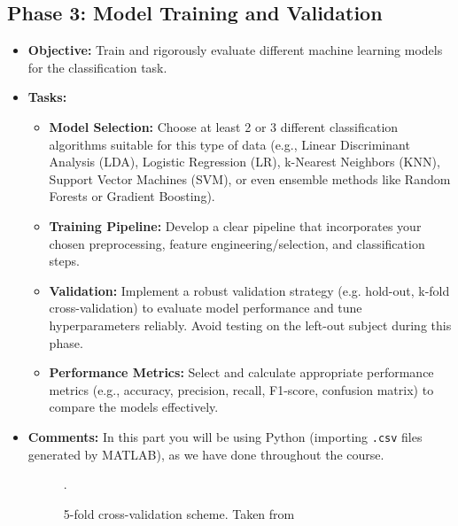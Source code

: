 \documentclass[11pt]{exam}
\begin{document}
    \subsection{Phase 3: Model Training and Validation}
    \begin{itemize}
        \item \textbf{Objective:} Train and rigorously evaluate different machine learning models for the classification task.
        \item \textbf{Tasks:}
        \begin{itemize}
            \item \textbf{Model Selection:} Choose at least 2 or 3 different classification algorithms suitable for this type of data (e.g., Linear Discriminant Analysis (LDA), Logistic Regression (LR), k-Nearest Neighbors (KNN), Support Vector Machines (SVM), or even ensemble methods like Random Forests or Gradient Boosting).
            \item \textbf{Training Pipeline:} Develop a clear pipeline that incorporates your chosen preprocessing, feature engineering/selection, and classification steps.
            \item \textbf{Validation:} Implement a robust validation strategy (e.g. hold-out, k-fold cross-validation) to evaluate model performance and tune hyperparameters reliably. Avoid testing on the left-out subject during this phase.
            \item \textbf{Performance Metrics:} Select and calculate appropriate performance metrics (e.g., accuracy, precision, recall, F1-score, confusion matrix) to compare the models effectively.
        \end{itemize}
        \item \textbf{Comments:} In this part you will be using Python (importing \texttt{.csv} files generated by MATLAB), as we have done throughout the course.
        \begin{figure}[htbp]
            \centering
            \caption{5-fold cross-validation scheme. Taken from \href{https://www.datacamp.com/tutorial/k-fold-cross-validation}{}}.
        \end{figure}


\end{itemize}
\end{document}
